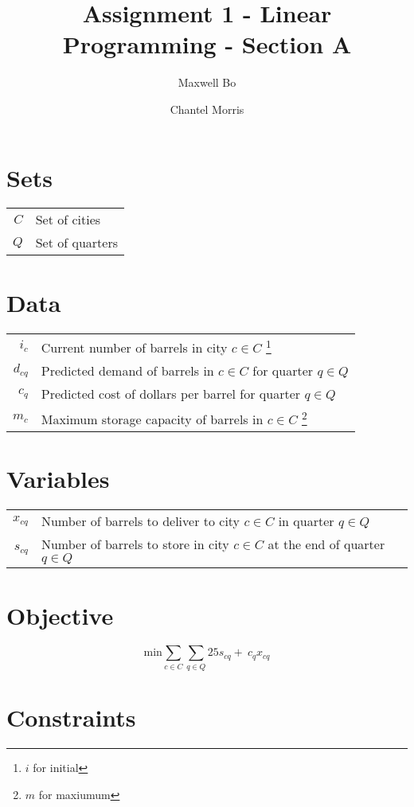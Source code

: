\documentclass[a4paper]{article}
\title{Assignment 1 - Linear Programming - Section A}
\author{Maxwell Bo  \and Chantel Morris}
\begin{document}
 

\maketitle

\section*{Sets}

\begin{tabular}{rl}
    $C$ & Set of cities\\
    $Q$ & Set of quarters
\end{tabular}

\section*{Data}

\begin{tabular}{rl}
    $i_c$ & Current number of barrels in city $c \in C$ \footnote{$i$ for initial}\\
    $d_{cq}$ & Predicted demand of barrels in $c \in C$ for quarter $q \in Q$\\
    $c_q$ & Predicted cost of dollars per barrel for quarter $q \in Q$\\
    $m_c$ & Maximum storage capacity of barrels in $c \in C$ \footnote{$m$ for maxiumum}
\end{tabular}

\section*{Variables}

\begin{tabular}{rl}
    $x_{cq}$ & Number of barrels to deliver to city $c \in C$ in quarter $q \in Q$\\
    $s_{cq}$ & Number of barrels to store in city $c \in C$ at the end of quarter $q \in Q$\\
\end{tabular}

\section*{Objective}

\[
\text{min} \sum_{c \in C}\sum_{q \in Q} 25 s_{cq} +\: c_q x_{cq}
\]

\section*{Constraints}
\end{document}
